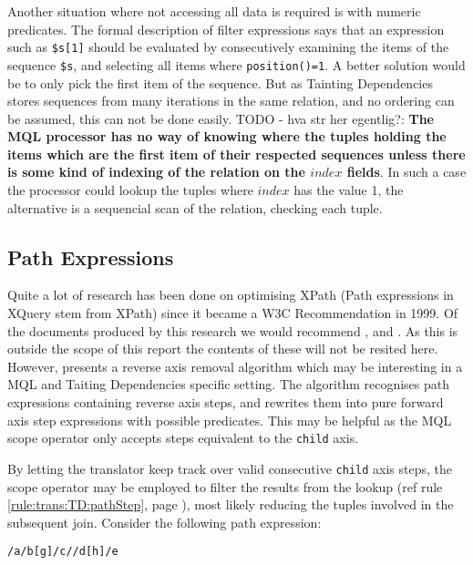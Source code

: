 Another situation where not accessing all data is required is with numeric predicates. The formal description of
filter expressions\cite{xquery_semantics} says that an expression such as
\texttt{\$s[1]} should be evaluated by consecutively examining the items of the sequence \texttt{\$s}, and selecting all items where
\texttt{position()=1}. A better solution would be to only pick the first item of the sequence. But as Tainting
Dependencies stores sequences from many iterations in the same relation, and no ordering can be assumed, this can
not be done easily. TODO - hva st\a r her egentlig?: \textbf{The MQL processor
has no way of knowing where the tuples holding the items which are the first item of their respected sequences unless there is some kind of indexing of the relation on the $index$
fields}. In such a case the processor could lookup the tuples where $index$ has the value 1, the alternative is a
sequencial scan of the relation, checking each tuple.

\subsection{Path Expressions}
\label{sect:disc:optim:path}
Quite a lot of research has been done on optimising XPath (Path expressions in XQuery stem from XPath) since it
became a W3C Recommendation in 1999. Of the documents produced by this research we would recommend
\cite{optimize_logic}, \cite{optimize_michiels} and \cite{optimize_xsltPath}. As this is outside the scope of this
report the contents of these will not be resited here. However, \cite{optimize_forward} presents a reverse axis
removal algorithm which may be interesting in a MQL and Taiting Dependencies
specific setting. The algorithm recognises path expressions containing reverse axis steps, and rewrites them into pure forward axis step
expressions with possible predicates. This may be helpful as the MQL \textsf{scope} operator only accepts steps
equivalent to the \texttt{child} axis.

By letting the translator keep track over valid consecutive \texttt{child} axis steps, the \textsf{scope} operator
may be employed to filter the results from the lookup (ref rule \ref{rule:trans:TD:pathStep}, page
\pageref{rule:trans:TD:pathStep}), most likely reducing the tuples involved in the subsequent join. Consider the
following path expression:

\begin{center}
\texttt{/a/b[g]/c//d[h]/e}
\end{center}

